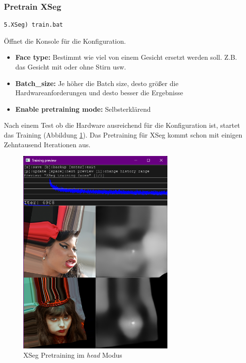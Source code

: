 \subsubsection*{Pretrain XSeg}
\begin{lstlisting}[label={lst:xseg-pretraining},numbers=none]
    5.XSeg) train.bat
\end{lstlisting}
Öffnet die Konsole für die Konfiguration.
\begin{itemize}
    \item \textbf{Face type:} Bestimmt wie viel von einem Gesicht ersetzt werden soll. Z.B. das Gesicht mit oder ohne Stirn usw.
    \item \textbf{Batch\_size:} Je höher die Batch size, desto größer die Hardwareanforderungen und desto besser die Ergebnisse
    \item \textbf{Enable pretraining mode:} Selbsterklärend
\end{itemize}
Nach einem Test ob die Hardware ausreichend für die Konfiguration ist, startet das Training (Abbildung \ref{fig:xseg-pretrain}).
Das Pretraining für XSeg kommt schon mit einigen Zehntausend Iterationen aus.
\begin{figure}
    \center
    \includegraphics[width=0.7\textwidth]{Bilder/DFL/XSegEditor-3-pretrain}
    \caption{XSeg Pretraining im \textit{head} Modus}
    \label{fig:xseg-pretrain}
\end{figure}

